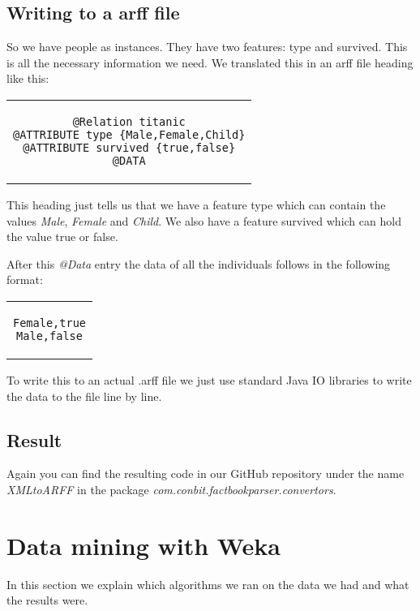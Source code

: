 \documentclass[a4]{article}
\begin{document}
\subsection{Writing to a arff file}
So we have people as instances. They have two features: type and survived. This is all the necessary information we need. We translated this in an arff file heading like this:
\begin{center}
\begin{tabular}{c}
\begin{lstlisting}
@Relation titanic
@ATTRIBUTE type {Male,Female,Child}
@ATTRIBUTE survived {true,false}
@DATA
\end{lstlisting}
\end{tabular}
\end{center}
This heading just tells us that we have a feature type which can contain the values \textit{Male}, \textit{Female} and \textit{Child}. We also have a feature survived which can hold the value true or false.\par
After this \textit{@Data} entry the data of all the individuals follows in the following format:
\begin{center}
\begin{tabular}{c}
\begin{lstlisting}
Female,true
Male,false
\end{lstlisting}
\end{tabular}
\end{center}
To write this to an actual .arff file we just use standard Java IO libraries to write the data to the file line by line.
\subsection{Result}
Again you can find the resulting code in our GitHub repository\cite{githubproject} under the name \textit{XMLtoARFF} in the package \textit{com.conbit.factbookparser.convertors}.
\section{Data mining with Weka}
In this section we explain which algorithms we ran on the data we had and what the results were.
\end{document}

